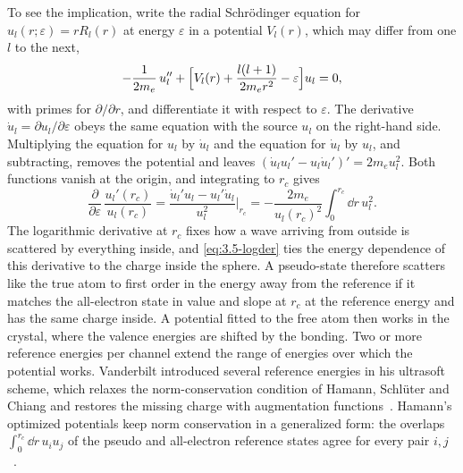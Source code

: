 To see the implication, write the radial Schr\"odinger equation for $u_l(r; \varepsilon) = rR_l(r)$ at energy $\varepsilon$ in a potential $V_l(r)$, which may differ from one $l$ to the next,
\begin{equation}
  -\frac{1}{2m_e}\,u_l'' + \Bigl[V_l(r) + \frac{l(l+1)}{2m_er^2} - \varepsilon\Bigr]u_l = 0 ,
  \label{eq:3.5-radial}
\end{equation}
with primes for $\partial/\partial r$, and differentiate it with respect to $\varepsilon$. The derivative $\dot u_l = \partial u_l/\partial\varepsilon$ obeys the same equation with the source $u_l$ on the right-hand side. Multiplying the equation for $u_l$ by $\dot u_l$ and the equation for $\dot u_l$ by $u_l$, and subtracting, removes the potential and leaves $(\dot u_lu_l' - u_l\dot u_l')' = 2m_eu_l^2$. Both functions vanish at the origin, and integrating to $r_c$ gives
\begin{equation}
  \frac{\partial}{\partial\varepsilon}\,\frac{u_l'(r_c)}{u_l(r_c)} = \frac{\dot u_l'u_l - u_l'\dot u_l}{u_l^2}\bigg|_{r_c} = -\frac{2m_e}{u_l(r_c)^2}\int_0^{r_c}\dd r\,u_l^2 .
  \label{eq:3.5-logder}
\end{equation}
The logarithmic derivative at $r_c$ fixes how a wave arriving from outside is scattered by everything inside, and \cref{eq:3.5-logder} ties the energy dependence of this derivative to the charge inside the sphere. A pseudo-state therefore scatters like the true atom to first order in the energy away from the reference if it matches the all-electron state in value and slope at $r_c$ at the reference energy and has the same charge inside. A potential fitted to the free atom then works in the crystal, where the valence energies are shifted by the bonding. Two or more reference energies per channel extend the range of energies over which the potential works. Vanderbilt introduced several reference energies in his ultrasoft scheme, which relaxes the norm-conservation condition of Hamann, Schl\"uter and Chiang and restores the missing charge with augmentation functions~\cite{vanderbilt1990soft}. Hamann's optimized potentials keep norm conservation in a generalized form: the overlaps $\int_0^{r_c}\dd r\,u_iu_j$ of the pseudo and all-electron reference states agree for every pair $i, j$~\cite[Eq.~(23)]{hamann2013optimized}.

